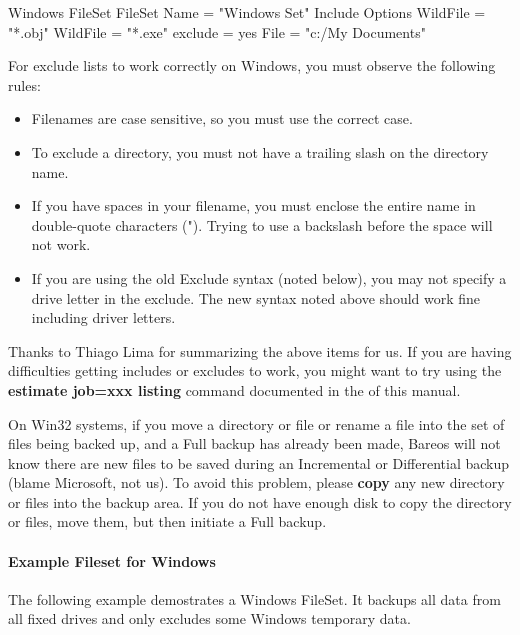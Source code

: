 \begin{bconfig}{Windows FileSet}
FileSet {
  Name = "Windows Set"
  Include {
    Options {
       WildFile = "*.obj"
       WildFile = "*.exe"
       exclude = yes
     }
     File = "c:/My Documents"
  }
}
\end{bconfig}

For exclude lists to work correctly on Windows, you must observe the following
rules:

\begin{itemize}
\item Filenames are case sensitive, so you must use the correct case.
\item To exclude a directory, you must not have a trailing slash on the
   directory name.
\item If you have spaces in your filename, you must enclose the entire name
   in double-quote characters ("). Trying to use a backslash before  the space
   will not work.
\item If you are using the old Exclude syntax (noted below), you may not
   specify a drive letter in the exclude.  The new syntax noted above
   should work fine including driver letters.
\end{itemize}

Thanks to Thiago Lima for summarizing the above items for us. If you are
having difficulties getting includes or excludes to work, you might want to
try using the {\bf estimate job=xxx listing} command documented in the
 of this manual.

On Win32 systems, if you move a directory or file or rename a file into the
set of files being backed up, and a Full backup has already been made, Bareos
will not know there are new files to be saved during an Incremental or
Differential backup (blame Microsoft, not us). To avoid this problem, please
{\bf copy} any new directory or files into the backup area. If you do not have
enough disk to copy the directory or files, move them, but then initiate a
Full backup.


\paragraph*{Example Fileset for Windows}

The following example demostrates a Windows FileSet.
It backups all data from all fixed drives and only excludes some Windows temporary data.

